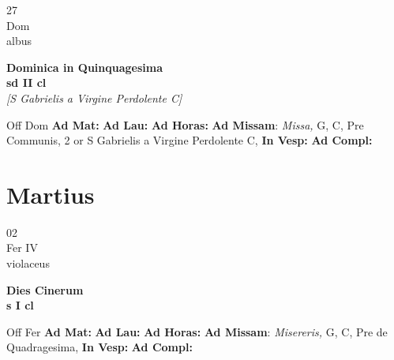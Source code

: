\documentclass[10pt, openany]{book}
\begin{document}
        \begin{center}
            \begin{minipage}{3.5in}
                \vspace{2em}
                \begin{minipage}{0.5in}
                    {\Huge 27} \\
                    {\normalsize Dom} \\
                    {\normalsize albus}
                \end{minipage}
                \begin{minipage}{3.0in}
                    \textbf{ \large Dominica in Quinquagesima \\
                    \textnormal{\normalsize sd II cl}} \\ \textit{[S Gabrielis a Virgine Perdolente C]} \\ 
                \end{minipage}
                \begin{justify}Off Dom
                    \textbf{Ad Mat: }
                    \textbf{Ad Lau: }
                    \textbf{Ad Horas: }\textbf{Ad Missam}: \textit{Missa,} G, C, Pre Communis, 2 or S Gabrielis a Virgine Perdolente C,  
                    \textbf{In Vesp: }
                    \textbf{Ad Compl: }
                \end{justify}
            \end{minipage}
        \end{center}
    
        \chapter{Martius}
                        
        \begin{center}
            \begin{minipage}{3.5in}
                \vspace{2em}
                \begin{minipage}{0.5in}
                    {\Huge 02} \\
                    {\normalsize Fer IV} \\
                    {\normalsize violaceus}
                \end{minipage}
                \begin{minipage}{3.0in}
                    \textbf{ \large Dies Cinerum \\
                    \textnormal{\normalsize s I cl}} \\ 
                \end{minipage}
                \begin{justify}Off Fer
                    \textbf{Ad Mat: }
                    \textbf{Ad Lau: }
                    \textbf{Ad Horas: }\textbf{Ad Missam}: \textit{Misereris,} G, C, Pre de Quadragesima,  
                    \textbf{In Vesp: }
                    \textbf{Ad Compl: }
                \end{justify}
            \end{minipage}
        \end{center}
    
\end{document}
